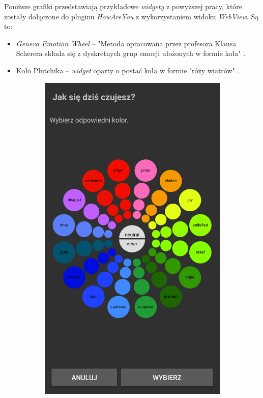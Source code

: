 \begin{itemize}
 	Poniższe grafiki przedstawiają przykładowe \textit{widgety} z powyższej pracy, które zostały dołączone do pluginu \textit{HowAreYou} z wykorzystaniem widoku \textit{WebView}. Są to:
 	
 	\begin{itemize}
 	\item \textit{Geneva Emotion Wheel} -- "Metoda opracowana przez profesora Klausa Scherera składa się z dyskretnych grup emocji ułożonych w formie koła" \cite{ArkadiuszLis}.
 	
 	\item Koło Plutchika -- \textit{widget} oparty o postać koła w formie "róży wiatrów" \cite{ArkadiuszLis}.
	\end{itemize}
	\clearpage
	
	\begin{figure}[H]
		\centering
		\begin{subfigure}{0.35\textwidth}
			\centering
			\includegraphics[scale=0.22]{rozdzial6/jspsych-geneva-wheel.png}

\end{subfigure}
\end{figure}
\end{itemize}
